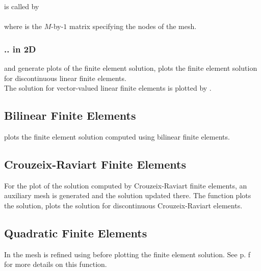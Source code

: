   is called by \\

 \\

 where  is the $M$-by-$1$ matrix specifying the nodes of the mesh.

\subsubsection{.. in 2D}

  and  generate plots of the finite element solution,  plots the finite element solution for discontinuous linear finite elements. \\

 The solution for vector-valued  linear finite elements is plotted by .



\subsection{Bilinear Finite Elements} 

  plots the finite element solution computed using bilinear finite elements.



\subsection{Crouzeix-Raviart Finite Elements} 

 For the plot of the solution computed by Crouzeix-Raviart finite elements, an auxiliary mesh is generated and the solution updated there. The function  plots the solution,  plots the solution for discontinuous Crouzeix-Raviart elements.



\subsection{Quadratic Finite Elements} 

 In  the mesh is refined using  before plotting the finite element solution. See p. \pageref{refine_REG}f for more details on this function.


